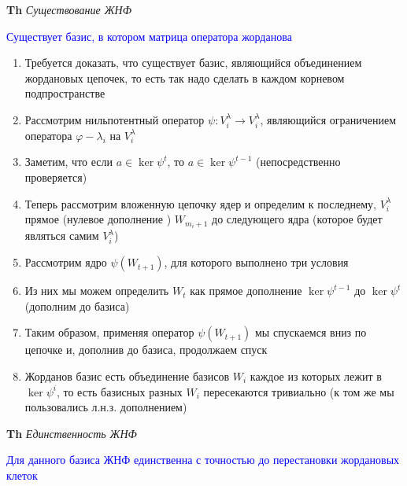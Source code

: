 \textbf{Th} \textit{Существование ЖНФ}

\textcolor{blue}{Существует базис, в котором матрица оператора жорданова}

\begin{enumerate}
    \item Требуется доказать, что существует базис, являющийся объединением жордановых цепочек, то есть так надо
    сделать в каждом корневом подпространстве
    \item Рассмотрим нильпотентный оператор $\psi: V^\lambda_i \rightarrow V^\lambda_i$, являющийся ограничением
    оператора $\varphi - \lambda_i$ на $V^\lambda_i$
    \item Заметим, что если $a \in \ker \psi^t$, то $a \in \ker \psi^{t-1}$ (непосредственно проверяется)
    \item Теперь рассмотрим вложенную цепочку ядер и определим к последнему, $V^\lambda_i$ прямое (нулевое дополнение
    ) $W_{m_i + 1}$ до следующего ядра (которое будет являться самим $V^\lambda_i$)
    \item Рассмотрим ядро $\psi (W_{t+1})$, для которого выполнено три условия
    \item Из них мы можем определить $W_t$ как прямое дополнение $\ker \psi^{t-1}$ до $\ker \psi^t$ (дополним до базиса)
    \item Таким образом, применяя оператор $\psi (W_{t+1})$ мы спускаемся вниз по цепочке и, дополнив до базиса,
    продолжаем спуск
    \item Жорданов базис есть объединение базисов $W_i$ каждое из которых лежит в $\ker \psi^i$, то есть базисных
    разных $W_i$ пересекаются тривиально (к том же мы пользовались л.н.з. дополнением)
\end{enumerate}

\textbf{Th} \textit{Единственность ЖНФ}

\textcolor{blue}{Для данного базиса ЖНФ единственна с точностью до перестановки жордановых клеток}

